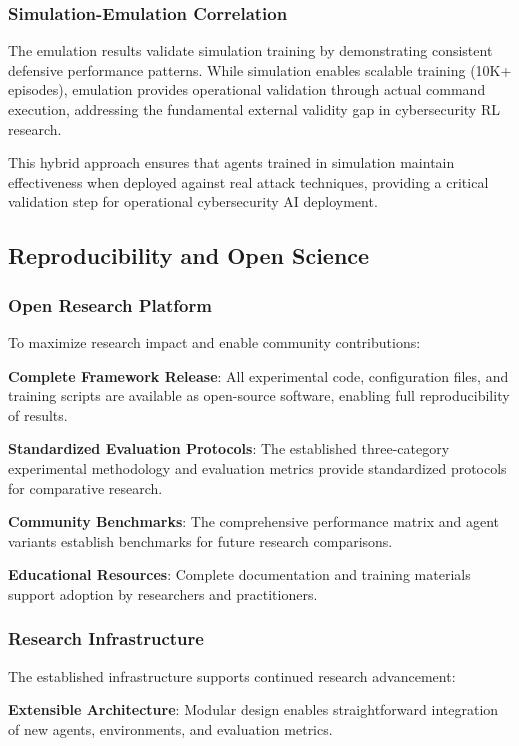 \documentclass[12pt,twoside]{article}
\theoremstyle{definition}
\theoremstyle{plain}
\begin{document}
\subsubsection{Simulation-Emulation Correlation}

The emulation results validate simulation training by demonstrating consistent defensive performance patterns. While simulation enables scalable training (10K+ episodes), emulation provides operational validation through actual command execution, addressing the fundamental external validity gap in cybersecurity RL research.

This hybrid approach ensures that agents trained in simulation maintain effectiveness when deployed against real attack techniques, providing a critical validation step for operational cybersecurity AI deployment.

\subsection{Reproducibility and Open Science}

\subsubsection{Open Research Platform}
To maximize research impact and enable community contributions:

\textbf{Complete Framework Release}: All experimental code, configuration files, and training scripts are available as open-source software, enabling full reproducibility of results.

\textbf{Standardized Evaluation Protocols}: The established three-category experimental methodology and evaluation metrics provide standardized protocols for comparative research.

\textbf{Community Benchmarks}: The comprehensive performance matrix and agent variants establish benchmarks for future research comparisons.

\textbf{Educational Resources}: Complete documentation and training materials support adoption by researchers and practitioners.

\subsubsection{Research Infrastructure}
The established infrastructure supports continued research advancement:

\textbf{Extensible Architecture}: Modular design enables straightforward integration of new agents, environments, and evaluation metrics.
\end{document}

